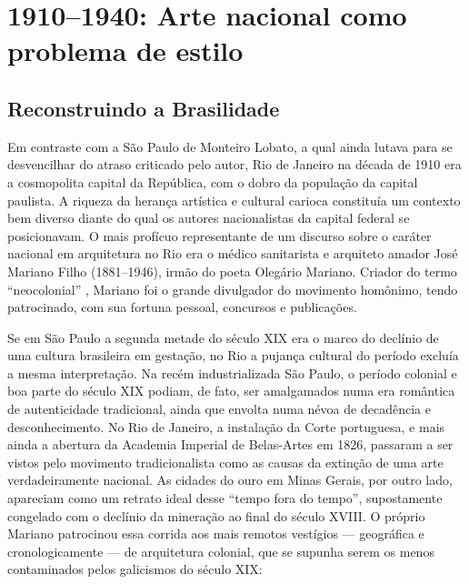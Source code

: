 \hypertarget{arte-nacional-como-problema-de-estilo}{%
\section{1910--1940: Arte nacional como problema de
estilo}\label{arte-nacional-como-problema-de-estilo}}

\hypertarget{reconstruindo-a-brasilidade}{%
\subsection{Reconstruindo a
Brasilidade}\label{reconstruindo-a-brasilidade}}

Em contraste com a São Paulo de Monteiro Lobato, a qual ainda lutava
para se desvencilhar do atraso criticado pelo autor, Rio de Janeiro na
década de 1910 era a cosmopolita capital da República, com o dobro da
população da capital paulista. A riqueza da herança artística e cultural
carioca constituía um contexto bem diverso diante do qual os autores
nacionalistas da capital federal se posicionavam. O mais profícuo
representante de um discurso sobre o caráter nacional em arquitetura no
Rio era o médico sanitarista e arquiteto amador José Mariano Filho
(1881--1946), irmão do poeta Olegário Mariano. Criador do termo
``neocolonial'' \autocite[p.~132]{kessel:2008arquitetura}, Mariano foi o
grande divulgador do movimento homônimo, tendo patrocinado, com sua
fortuna pessoal, concursos e publicações.

Se em São Paulo a segunda metade do século XIX era o marco do declínio
de uma cultura brasileira em gestação, no Rio a pujança cultural do
período excluía a mesma interpretação. Na recém industrializada São
Paulo, o período colonial e boa parte do século XIX podiam, de fato, ser
amalgamados numa era romântica de autenticidade tradicional, ainda que
envolta numa névoa de decadência e desconhecimento. No Rio de Janeiro, a
instalação da Corte portuguesa, e mais ainda a abertura da Academia
Imperial de Belas-Artes em 1826, passaram a ser vistos pelo movimento
tradicionalista como as causas da extinção de uma arte verdadeiramente
nacional. As cidades do ouro em Minas Gerais, por outro lado, apareciam
como um retrato ideal desse ``tempo fora do tempo'', supostamente
congelado com o declínio da mineração ao final do século XVIII. O
próprio Mariano patrocinou essa corrida aos mais remotos vestígios ---
geográfica e cronologicamente --- de arquitetura colonial, que se
supunha serem os menos contaminados pelos galicismos do século XIX:

